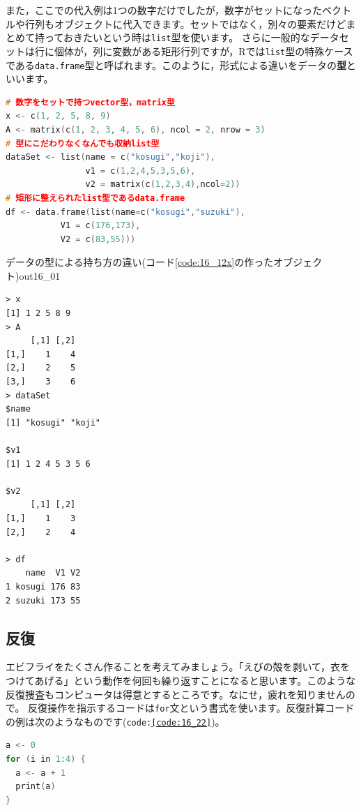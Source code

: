 \documentclass{ltjsbook}
\begin{document}
また，ここでの代入例は1つの数字だけでしたが，数字がセットになったベクトルや行列もオブジェクトに代入できます。セットではなく，別々の要素だけどまとめて持っておきたいという時は\verb|list|型を使います。
さらに一般的なデータセットは行に個体が，列に変数がある矩形行列ですが，Rでは\verb|list|型の特殊ケースである\verb|data.frame|型と呼ばれます。このように，形式による違いをデータの\textbf{型}といいます。
\begin{lstlisting}[language=c++,label={code:16_12x},caption={さまざまなデータの型}]
# 数字をセットで持つvector型，matrix型
x <- c(1, 2, 5, 8, 9)
A <- matrix(c(1, 2, 3, 4, 5, 6), ncol = 2, nrow = 3)
# 型にこだわりなくなんでも収納list型
dataSet <- list(name = c("kosugi","koji"),
                v1 = c(1,2,4,5,3,5,6),
                v2 = matrix(c(1,2,3,4),ncol=2))
# 矩形に整えられたlist型であるdata.frame
df <- data.frame(list(name=c("kosugi","suzuki"),
           V1 = c(176,173),
           V2 = c(83,55)))
\end{lstlisting}

\begin{Rscreen}{データの型による持ち方の違い(コード\ref{code:16_12x}の作ったオブジェクト)}{out16_01}
	\begin{verbatim}
> x
[1] 1 2 5 8 9
> A
     [,1] [,2]
[1,]    1    4
[2,]    2    5
[3,]    3    6
> dataSet
$name
[1] "kosugi" "koji"  

$v1
[1] 1 2 4 5 3 5 6

$v2
     [,1] [,2]
[1,]    1    3
[2,]    2    4

> df
    name  V1 V2
1 kosugi 176 83
2 suzuki 173 55\end{verbatim}
\end{Rscreen}


\subsection{反復}
エビフライをたくさん作ることを考えてみましょう。「えびの殻を剥いて，衣をつけてあげる」という動作を何回も繰り返すことになると思います。このような反復捜査もコンピュータは得意とするところです。なにせ，疲れを知りませんので。
反復操作を指示するコードは\texttt{for}文という書式を使います。反復計算コードの例は次のようなものです(\texttt{code:\ref{code:16_22}})。

\begin{lstlisting}[language=c++,label={code:16_22},caption={反復操作1}]
a <- 0
for (i in 1:4) {
  a <- a + 1
  print(a)
}
\end{lstlisting}
\end{document}
